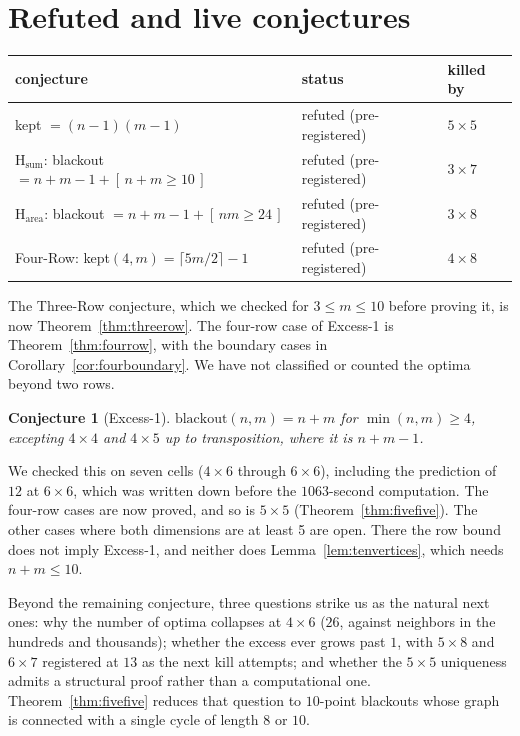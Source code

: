 \documentclass[12pt]{article}
\newtheorem{conjecture}{Conjecture}
\theoremstyle{definition}\newtheorem{definition}{Definition}
\theoremstyle{remark}\newtheorem{remark}{Remark}
\begin{document}
\section{Refuted and live conjectures}\label{sec:conjectures}
\begin{table}[h]\centering
\begin{tabular}{lll}
\toprule
conjecture & status & killed by \\
\midrule
kept $=(n-1)(m-1)$ & refuted (pre-registered) & $5\times 5$ \\
H$_{\text{sum}}$: blackout $= n+m-1+[\,n+m\ge 10\,]$ & refuted (pre-registered) & $3\times 7$ \\
H$_{\text{area}}$: blackout $= n+m-1+[\,nm\ge 24\,]$ & refuted (pre-registered) & $3\times 8$ \\
Four-Row: kept$(4,m) = \lceil 5m/2\rceil - 1$ & refuted (pre-registered) & $4\times 8$ \\
\bottomrule
\end{tabular}
\end{table}

The Three-Row conjecture, which we checked for $3\le m\le10$ before proving it, is
now Theorem~\ref{thm:threerow}. The four-row case of Excess-1 is
Theorem~\ref{thm:fourrow}, with the boundary cases in
Corollary~\ref{cor:fourboundary}. We have not classified or counted the optima
beyond two rows.

\begin{conjecture}[Excess-1]\label{conj:excess}
$\mathrm{blackout}(n,m)=n+m$ for $\min(n,m)\ge 4$, excepting $4\times4$ and
$4\times5$ up to transposition, where it is $n+m-1$.
\end{conjecture}
We checked this on seven cells ($4\times 6$ through $6\times 6$), including the
prediction of $12$ at $6\times 6$, which was written down before the
$1063$-second computation. The four-row cases are now proved, and so is
$5\times5$ (Theorem~\ref{thm:fivefive}). The other cases where both dimensions
are at least 5 are open. There the row bound does not imply Excess-1, and
neither does Lemma~\ref{lem:tenvertices}, which needs $n+m\le10$.

Beyond the remaining conjecture, three questions strike us as the natural next ones: why
the number of optima collapses at $4\times 6$ ($26$, against neighbors in the
hundreds and thousands); whether the excess ever grows past $1$, with $5\times 8$ and
$6\times 7$ registered at $13$ as the next kill attempts; and whether the
$5\times 5$ uniqueness admits a structural proof rather than a computational one.
Theorem~\ref{thm:fivefive} reduces that question to $10$-point blackouts whose graph is
connected with a single cycle of length $8$ or $10$.
\end{document}
